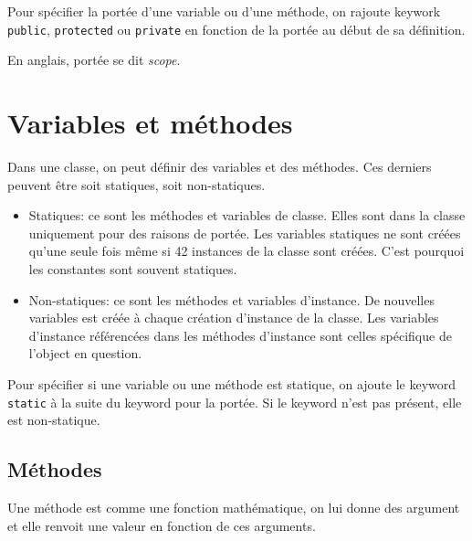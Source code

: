 Pour spécifier la portée d'une variable ou d'une méthode, on rajoute
keywork \verb|public|, \verb|protected| ou \verb|private| en fonction
de la portée au début de sa définition.

En anglais, portée se dit \emph{scope}.

\section{Variables et méthodes}
Dans une classe, on peut définir des variables et des méthodes.
Ces derniers peuvent être soit statiques, soit non-statiques.
\begin{itemize}
  \item Statiques: ce sont les méthodes et variables de classe.
    Elles sont dans la classe uniquement pour des raisons de portée.
    Les variables statiques ne sont créées qu'une seule fois même si
    42 instances de la classe sont créées.
    C'est pourquoi les constantes sont souvent statiques.
  \item Non-statiques: ce sont les méthodes et variables d'instance.
    De nouvelles variables est créée à chaque création d'instance de
    la classe.
    Les variables d'instance référencées dans les méthodes d'instance
    sont celles spécifique de l'object en question.
\end{itemize}

Pour spécifier si une variable ou une méthode est statique,
on ajoute le keyword \verb|static|
à la suite du keyword pour la portée.
Si le keyword n'est pas présent, elle est non-statique.

\subsection{Méthodes}
Une méthode est comme une fonction mathématique, on lui donne des
argument et elle renvoit une valeur en fonction de ces arguments.

